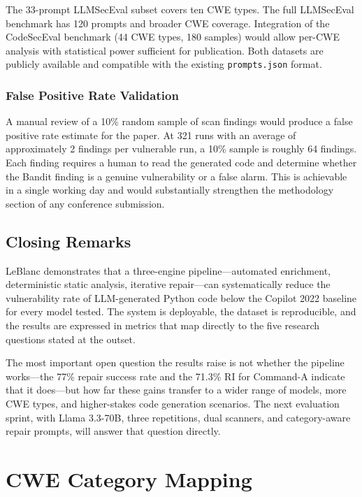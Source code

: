 \documentclass[12pt,a4paper]{report}
\begin{document}
The 33-prompt LLMSecEval subset covers ten CWE types. The full LLMSecEval
benchmark has 120 prompts and broader CWE coverage. Integration of the
CodeSecEval benchmark (44 CWE types, 180 samples) would allow per-CWE analysis
with statistical power sufficient for publication. Both datasets are publicly
available and compatible with the existing \texttt{prompts.json} format.

\subsection{False Positive Rate Validation}
\label{ssec:fw_fpr}

A manual review of a 10\% random sample of scan findings would produce a false
positive rate estimate for the paper. At 321 runs with an average of approximately
2 findings per vulnerable run, a 10\% sample is roughly 64 findings. Each finding
requires a human to read the generated code and determine whether the Bandit
finding is a genuine vulnerability or a false alarm. This is achievable in a
single working day and would substantially strengthen the methodology section of
any conference submission.

\section{Closing Remarks}
\label{sec:closing}

LeBlanc demonstrates that a three-engine pipeline---automated enrichment,
deterministic static analysis, iterative repair---can systematically reduce the
vulnerability rate of LLM-generated Python code below the Copilot 2022 baseline
for every model tested. The system is deployable, the dataset is reproducible,
and the results are expressed in metrics that map directly to the five research
questions stated at the outset.

The most important open question the results raise is not whether the pipeline
works---the 77\% repair success rate and the 71.3\% RI for Command-A indicate
that it does---but how far these gains transfer to a wider range of models,
more CWE types, and higher-stakes code generation scenarios. The next evaluation
sprint, with Llama 3.3-70B, three repetitions, dual scanners, and category-aware
repair prompts, will answer that question directly.

\appendix
\chapter{CWE Category Mapping}
\label{app:cwemap}
\end{document}
